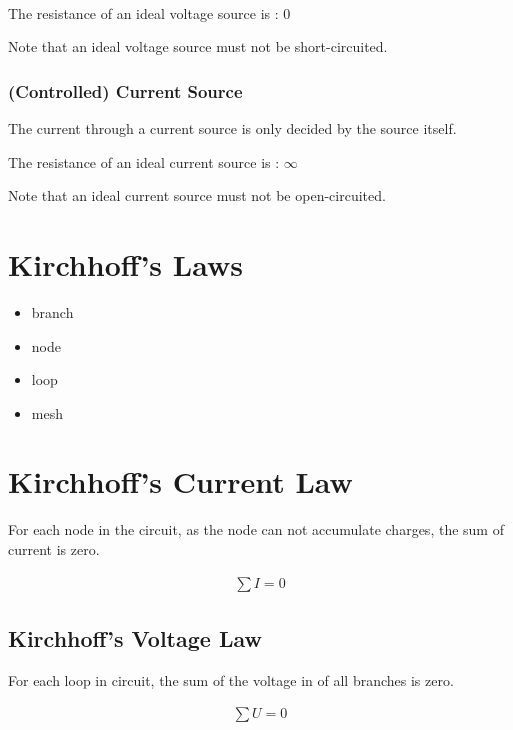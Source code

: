 \documentclass{article}
\begin{document}
The resistance of an ideal voltage source is : $0$

Note that an ideal voltage source must not be short-circuited.

\subsubsection{(Controlled) Current Source}

The current through a current source is only decided by the source itself.

The resistance of an ideal current source is : $\infty$

Note that an ideal current source must not be open-circuited.

\section{Kirchhoff's Laws}

\begin{itemize}
\item branch
\item node
\item loop
\item mesh
  
\end{itemize}

\section{Kirchhoff's Current Law}

For each node in the circuit, as the node can not accumulate charges, the sum of current is zero.

\begin{equation*}
  \begin{aligned}
    \sum I = 0
  \end{aligned}
\end{equation*}



\subsection{Kirchhoff's Voltage Law}

For each loop in circuit, the sum of the voltage in of all branches is zero.

\begin{equation*}
  \begin{aligned}
    \sum U = 0
  \end{aligned}
\end{equation*}
\end{document}
